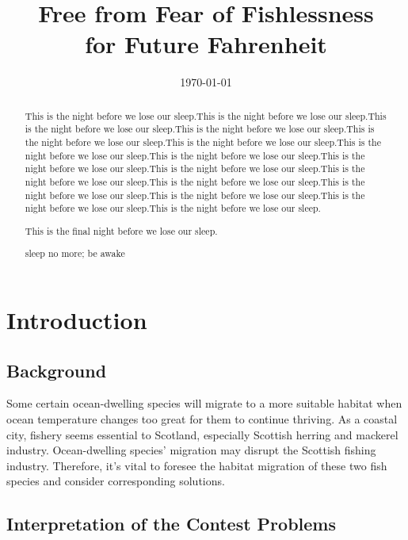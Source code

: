 \documentclass{mcmthesis}
\title{Free from Fear of Fishlessness \\for Future Fahrenheit}
\date{\today}
\begin{document}
\begin{abstract}
This is the night before we lose our sleep.This is the night before we lose our sleep.This is the night before we lose our sleep.This is the night before we lose our sleep.This is the night before we lose our sleep.This is the night before we lose our sleep.This is the night before we lose our sleep.This is the night before we lose our sleep.This is the night before we lose our sleep.This is the night before we lose our sleep.This is the night before we lose our sleep.This is the night before we lose our sleep.This is the night before we lose our sleep.This is the night before we lose our sleep.This is the night before we lose our sleep.This is the night before we lose our sleep.

This is the final night before we lose our sleep.
\begin{keywords}
sleep no more; be awake
\end{keywords}
\end{abstract}

\maketitle
\tableofcontents
\newpage


\section{Introduction}
\subsection{Background}
Some certain ocean-dwelling species will migrate to a more suitable habitat when ocean temperature changes too great for them to continue thriving.
As a coastal city, fishery seems essential to Scotland, especially Scottish herring and mackerel industry. Ocean-dwelling species' migration may disrupt the Scottish fishing industry.
Therefore, it's vital to foresee the habitat migration of these two fish species and consider corresponding solutions.

\subsection{Interpretation of the Contest Problems}
\end{document}
